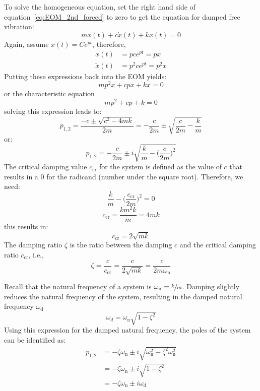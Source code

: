 \documentclass[12pt,letter]{article}
\begin{document}
To solve the homogeneous equation, set the right hand side of equation~\ref{eq:EOM_2nd_forced} to zero to get the equation for damped free vibration:
\begin{equation}
m \ddot{x}(t) + c\dot{x}(t) + kx(t) = 0
\end{equation}
Again, assume $x(t) = Ce^{pt}$, therefore, 
\begin{align}
\dot{x}(t)&= p c e^{ p t}  = px\\
\ddot{x}(t)&= p^2 c e^{ p t} = p^2x \nonumber
\end{align}
Putting these expressions back into the EOM yields:
\begin{equation}
m p^2 x + c p x + k x = 0
\end{equation}
or the characteristic equation
\begin{equation}
mp^2 + c p + k = 0
\end{equation}
solving this expression leads to:
\begin{equation}
p_{1,2} = \frac{-c \pm \sqrt{c^2 -4 m k}}{2 m} = - \frac{c}{2m} \pm \sqrt{\frac{c}{2m} - \frac{k}{m}}
\end{equation}
or:
\begin{equation}
p_{1,2} = - \frac{c}{2m} \pm i \sqrt{\frac{k}{m} - \bigg( \frac{c}{2m}\bigg)^2}
\end{equation}
The critical damping value $c_\text{cr}$ for the system is defined as the value of $c$ that results in a 0 for the radicand (number under the square root). Therefore, we need:
\begin{equation}
\frac{k}{m} - \bigg( \frac{c_\text{cr}}{2m}\bigg)^2 = 0
\end{equation}
\begin{equation}
c_\text{cr} = \frac{k m^2 k}{m} = 4 m k
\end{equation}
this results in:
\begin{equation}
c_\text{cr} = 2  \sqrt{m k}
\end{equation}
The damping ratio $\zeta$ is the ratio between the damping $c$ and the critical damping ratio $c_\text{cr}$, i.e.,
\begin{equation}
\zeta = \frac{c}{c_\text{cr}} = \frac{c}{2 \sqrt{m k}} = \frac{c}{2m\omega_\text{n}}
\end{equation}

Recall that the natural frequency of a system is $\omega_\text{n} = \sfrac{k}{m}$. Damping slightly reduces the natural frequency of the system, resulting in the damped natural frequency $\omega_\text{d}$
\begin{equation}
	\omega_d = \omega_\text{n}\sqrt{1-\zeta^2}
\end{equation} 
Using this expression for the damped natural frequency, the poles of the system can be identified as:
\begin{align}
	p_{1,2} &= - \zeta \omega_\text{n} \pm i  \sqrt{\omega_\text{n}^2 - \zeta^2 \omega_\text{n}^2} \\
&= - \zeta \omega_\text{n} \pm i  \sqrt{1 - \zeta^2} \nonumber \\ \nonumber
&= - \zeta \omega_\text{n} \pm i \omega_\text{d} \nonumber
\end{align}
\end{document}
